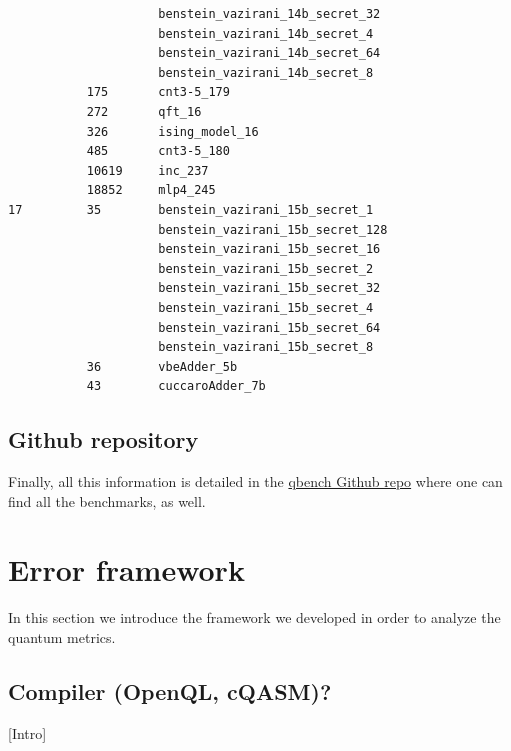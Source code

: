 \begin{itemize}
\begin{verbatim}
                     benstein_vazirani_14b_secret_32 
                     benstein_vazirani_14b_secret_4  
                     benstein_vazirani_14b_secret_64 
                     benstein_vazirani_14b_secret_8  
           175       cnt3-5_179                      
           272       qft_16                          
           326       ising_model_16                  
           485       cnt3-5_180                      
           10619     inc_237                         
           18852     mlp4_245                        
17         35        benstein_vazirani_15b_secret_1  
                     benstein_vazirani_15b_secret_128
                     benstein_vazirani_15b_secret_16 
                     benstein_vazirani_15b_secret_2  
                     benstein_vazirani_15b_secret_32 
                     benstein_vazirani_15b_secret_4  
                     benstein_vazirani_15b_secret_64 
                     benstein_vazirani_15b_secret_8  
           36        vbeAdder_5b                     
           43        cuccaroAdder_7b                 

\end{verbatim}
\end{itemize}



\subsection*{Github repository}
\label{sec:orgc2bf96d}

Finally, all this information is detailed in the \href{https://github.com/QE-Lab/qbench}{qbench Github repo} where one can find all the benchmarks, as well.

\section*{Error framework}
\label{sec:org80e1604}
In this section we introduce the framework we developed in order to analyze the quantum metrics.

\subsection*{Compiler (OpenQL, cQASM)?}
\label{sec:org06f6c35}
[Intro]


